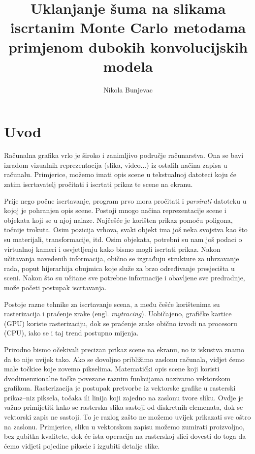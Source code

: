 \documentclass[times, utf8, seminar, numeric]{fer}
\newcommand{\eng}[1]{(engl. \textsl{#1}\/)}
\begin{document}
\nocite{*}

\title{Uklanjanje šuma na slikama iscrtanim Monte Carlo
metodama primjenom dubokih konvolucijskih modela}

\author{Nikola Bunjevac}


\maketitle

\tableofcontents

\chapter{Uvod}
Računalna grafika vrlo je široko i zanimljivo područje računarstva. Ona se bavi izradom vizualnih
reprezentacija (slika, video...) iz ostalih načina zapisa u računalu. Primjerice, možemo imati
opis scene u tekstualnoj datoteci koju će zatim iscrtavatelj  pročitati i iscrtati
prikaz te scene na ekranu.

Prije nego počne iscrtavanje, program prvo mora pročitati i \textit{parsirati} datoteku u kojoj
je pohranjen opis scene. Postoji mnogo načina reprezentacije scene i objekata koji se u njoj
nalaze. Najčešće je korišten prikaz pomoću poligona, točnije trokuta. Osim pozicija vrhova,
svaki objekt ima još neka svojstva kao što su materijali, transformacije, itd. Osim objekata,
potrebni su nam još podaci o virtualnoj kameri i osvjetljenju kako bismo mogli iscrtati prikaz.
Nakon učitavanja navedenih informacija, obično se izgrađuju strukture za ubrzavanje rada, poput
hijerarhija obujmica  koje služe za brzo određivanje
presjecišta u sceni. Nakon što su učitane sve potrebne informacije i obavljene sve predradnje,
može početi postupak iscrtavanja.

Postoje razne tehnike za iscrtavanje scena, a među češće korištenima su rasterizacija i
praćenje zrake \eng{raytracing}. Uobičajeno, grafičke kartice (GPU) koriste rasterizaciju, dok
se praćenje zrake obično izvodi na procesoru (CPU), iako se i taj trend postupno mijenja.

Prirodno bismo očekivali precizan prikaz scene na ekranu, no iz iskustva znamo da to nije uvijek
tako. Ako se dovoljno približimo zaslonu računala, vidjet ćemo male točkice koje zovemo pikselima.
Matematički opis scene koji koristi dvodimenzionalne točke povezane raznim funkcijama nazivamo
vektorskom grafikom.
Rasterizacija je postupak pretvorbe iz vektorske grafike u rasterski prikaz--niz piksela, točaka
ili linija koji zajedno na zaslonu tvore sliku. Ovdje je važno primijetiti kako se rasterska
slika sastoji od diskretnih elemenata, dok se vektorski zapis ne sastoji. To je razlog zašto
ne možemo uvijek prikazati sve oštro na zaslonu. Primjerice, sliku u vektorskom zapisu možemo
zumirati proizvoljno, bez gubitka kvalitete, dok će ista operacija na rasterskoj slici dovesti
do toga da ćemo vidjeti pojedine piksele i izgubiti detalje slike.
\end{document}
